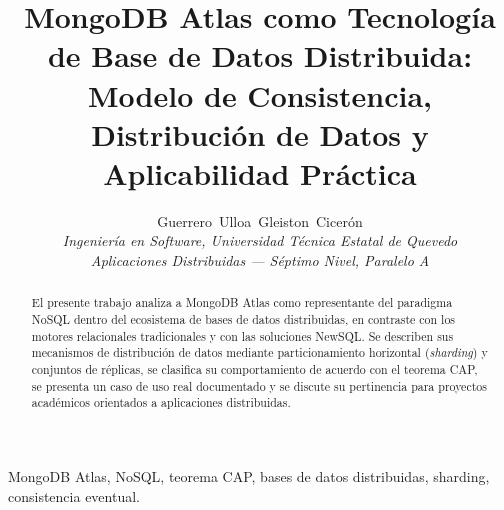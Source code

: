 \documentclass[10pt,journal]{IEEEtran}
\begin{document}
\twocolumn

\title{MongoDB Atlas como Tecnolog\'ia de Base de Datos Distribuida: Modelo de Consistencia, Distribuci\'on de Datos y Aplicabilidad Pr\'actica}

\author{Guerrero~Ulloa~Gleiston~Cicer\'on\\
\textit{Ingenier\'ia en Software, Universidad T\'ecnica Estatal de Quevedo}\\
\textit{Aplicaciones Distribuidas --- S\'eptimo Nivel, Paralelo A}}

\maketitle

\begin{abstract}
El presente trabajo analiza a MongoDB Atlas como representante del paradigma NoSQL dentro del ecosistema de bases de datos distribuidas, en contraste con los motores relacionales tradicionales y con las soluciones NewSQL. Se describen sus mecanismos de distribuci\'on de datos mediante particionamiento horizontal (\textit{sharding}) y conjuntos de r\'eplicas, se clasifica su comportamiento de acuerdo con el teorema CAP, se presenta un caso de uso real documentado y se discute su pertinencia para proyectos acad\'emicos orientados a aplicaciones distribuidas.
\end{abstract}

\begin{IEEEkeywords}
MongoDB Atlas, NoSQL, teorema CAP, bases de datos distribuidas, sharding, consistencia eventual.
\end{IEEEkeywords}
\end{document}
